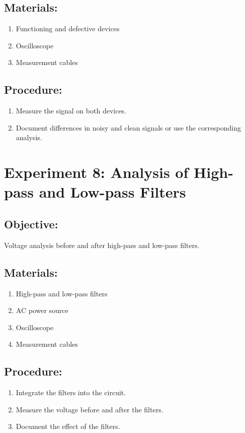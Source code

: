 \documentclass[]{scrreprt}
\begin{document}
    \subsection*{Materials:}
    \begin{enumerate}
        \item Functioning and defective devices
        \item Oscilloscope
        \item Measurement cables
    \end{enumerate}
    \subsection*{Procedure:}
    \begin{enumerate}
        \item Measure the signal on both devices.
        \item Document differences in noisy and clean signals or use the corresponding analysis.
    \end{enumerate}

    \section*{Experiment 8: Analysis of High-pass and Low-pass Filters}
    \subsection*{Objective:} Voltage analysis before and after high-pass and low-pass filters.
    \subsection*{Materials:}
    \begin{enumerate}
        \item High-pass and low-pass filters
        \item AC power source
        \item Oscilloscope
        \item Measurement cables
    \end{enumerate}
    \subsection*{Procedure:}
    \begin{enumerate}
        \item Integrate the filters into the circuit.
        \item Measure the voltage before and after the filters.
        \item Document the effect of the filters.
    \end{enumerate}
\end{document}
